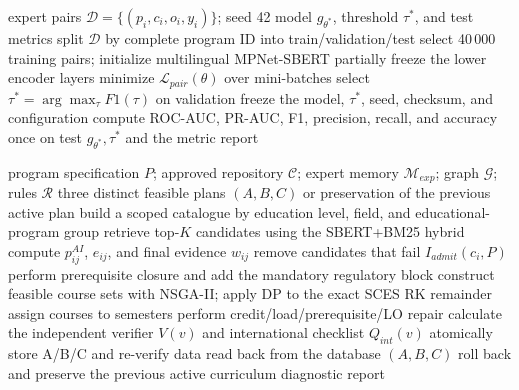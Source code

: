 \documentclass[twoside,11pt]{article}
\begin{document}
\begin{algorithm}[H]
\caption{Fine-tuning and independent evaluation of the course--LO model}
\label{alg:sbert-training}
\begin{algorithmic}[1]
\Require expert pairs $\mathcal{D}=\{(p_i,c_i,o_i,y_i)\}$; seed 42
\Ensure model $g_{\theta^\ast}$, threshold $\tau^\ast$, and test metrics
\State split $\mathcal{D}$ by complete program ID into train/validation/test
\State select 40\,000 training pairs; initialize multilingual MPNet-SBERT
\State partially freeze the lower encoder layers
  \State minimize $\mathcal{L}_{pair}(\theta)$ over mini-batches
\EndFor
\State select $\tau^\ast=\arg\max_\tau F1(\tau)$ on validation
\State freeze the model, $\tau^\ast$, seed, checksum, and configuration
\State compute ROC-AUC, PR-AUC, F1, precision, recall, and accuracy once on test
\State \Return $g_{\theta^\ast},\tau^\ast$ and the metric report
\end{algorithmic}
\end{algorithm}

\begin{algorithm}[H]
\caption{Evidence-constrained end-to-end synthesis of A/B/C alternatives}
\label{alg:end-to-end-synthesis}
\begin{algorithmic}[1]
\Require program specification $P$; approved repository $\mathcal{C}$; expert memory $\mathcal{M}_{exp}$; graph $\mathcal{G}$; rules $\mathcal{R}$
\Ensure three distinct feasible plans $(A,B,C)$ or preservation of the previous active plan
\State build a scoped catalogue by education level, field, and educational-program group
  \State retrieve top-$K$ candidates using the SBERT+BM25 hybrid
  \State compute $p^{AI}_{ij}$, $e_{ij}$, and final evidence $w_{ij}$
  \State remove candidates that fail $I_{admit}(c_i,P)$
\EndFor
\State perform prerequisite closure and add the mandatory regulatory block
\State construct feasible course sets with NSGA-II; apply DP to the exact SCES RK remainder
  \State assign courses to semesters
  \State perform credit/load/prerequisite/LO repair
  \State calculate the independent verifier $V(v)$ and international checklist $Q_{int}(v)$
\EndFor
{}
  \State atomically store A/B/C and re-verify data read back from the database
  \State \Return $(A,B,C)$
\Else
  \State roll back and preserve the previous active curriculum
  \State \Return diagnostic report
\EndIf
\end{algorithmic}
\end{algorithm}
\end{document}
